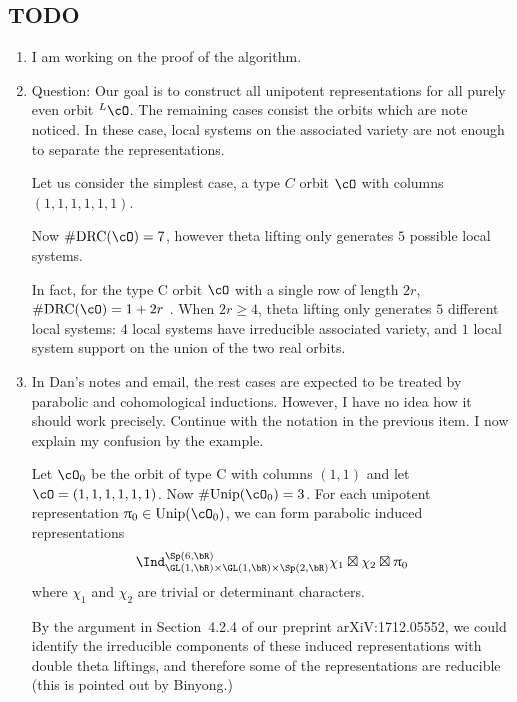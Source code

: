 \documentclass[12pt,a4paper]{amsart}
\numberwithin{equation}{section}
\theoremstyle{remark}
\def\drc{\mathrm{DRC}}
\def\Unip{\mathrm{Unip}}
\begin{document}
{\subsection*{TODO}
\begin{enumerate}
  \item I am working on the proof of the algorithm.
  \item {\color{red} Question:}
        Our goal is to construct all unipotent representations for all purely
        even orbit ${}^{L}\cO$. The remaining cases consist the orbits which are
        note noticed. In these case, local systems on the associated variety are
        not enough to separate the representations.

        Let us consider the simplest case, a type $C$ orbit $\cO$ with columns
        $(1,1,1,1,1,1)$.

        Now $\#\drc(\cO) = 7$, however theta lifting only generates $5$ possible
        local systems.

        In fact, for the type C orbit $\cO$ with a single row of length $2r$,
        $\#\drc(\cO) = 1+2r$ . When $2r\geq 4$, theta lifting only generates $5$ different
        local systems: $4$ local systems have irreducible associated variety,
        and $1$ local system support on
        the union of the two real orbits.
  \item
         In Dan's notes and email, the rest
        cases are expected to be treated by parabolic and
        cohomological inductions. However, I have no idea how it should work precisely.
        Continue with the notation in the previous item.
        I now explain my confusion by the example.

        Let $\cO_{0}$ be the orbit of type C with columns $(1,1)$ and let
        $\cO = (1,1,1,1,1,1)$. Now $\#\Unip(\cO_{0})=3$. For each unipotent representation
        $\uppi_{0}\in \Unip(\cO_{0})$,
        we can form parabolic induced representations
        \[
        \Ind_{\GL(1,\bR)\times \GL(1,\bR)\times \Sp(2,\bR)}^{\Sp(6,\bR)} \chi_{1} \boxtimes \chi_{2}\boxtimes \uppi_{0}
        \]
        where $\chi_{1}$ and $\chi_{2}$ are trivial or determinant characters.

        By the argument in Section~4.2.4 of our preprint arXiV:1712.05552, we
        could identify {\color{red} the irreducible components of} these induced representations with double theta liftings,
        and therefore {\color{red} some of the representations are reducible}
        (this is pointed out by Binyong.)


\end{enumerate}}
\end{document}
